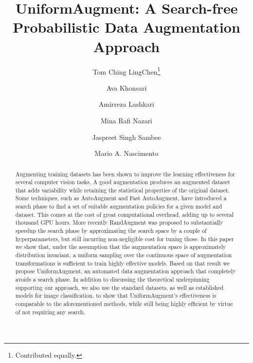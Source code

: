 \documentclass[runningheads]{llncs}
\begin{document}
	
	\pagestyle{headings}
	\mainmatter
	


	\title{UniformAugment: A Search-free Probabilistic Data Augmentation Approach} 



	


	
\author{Tom Ching LingChen\footnote[1]{Contributed equally.} \and
		Ava Khonsari\inst{1 \star} \and
		Amirreza Lashkari\inst{1 \star} \and
		Mina Rafi Nazari\inst{1 \star} \and
		Jaspreet Singh Sambee\inst{1 \star} \and
		Mario A. Nascimento}
	
	\authorrunning{ }


	
\maketitle
	
	\begin{abstract}
Augmenting training datasets has been shown to improve the learning effectiveness for several computer vision tasks. A good augmentation produces an augmented dataset that adds variability while retaining the statistical properties of the original dataset. Some techniques, such as AutoAugment and Fast AutoAugment, have introduced a search phase to find a set of suitable augmentation policies for a given model and dataset.  This comes at the cost of great computational overhead, adding up to several thousand GPU hours. More recently RandAugment was proposed to substantially speedup the search phase by approximating the search space by a couple of hyperparameters, but still incurring non-negligible cost for tuning those. In this paper we show that, under the assumption that the augmentation space is approximately distribution invariant, a uniform sampling over the continuous space of augmentation transformations is sufficient to train highly effective models. Based on that result we propose UniformAugment, an automated data augmentation approach that completely avoids a search phase. In addition to discussing the theoretical underpinning supporting our approach, we also use the standard datasets, as well as established models for image classification, to show that UniformAugment's effectiveness is comparable to the aforementioned methods, while still being highly efficient by virtue of not requiring any search.
		


	\end{abstract}
	
\end{document}
